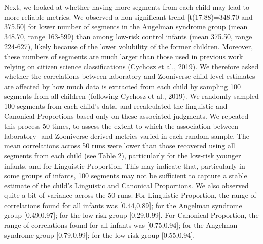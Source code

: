 \documentclass[english,,man]{apa6}
\begin{document}
Next, we looked at whether having more segments from each child may lead to more reliable metrics. We observed a non-significant trend {[}t(17.88)=348.70 and 375.50{]} for lower number of segments in the Angelman syndrome group (mean 348.70, range 163-599) than among low-risk control infants (mean 375.50, range 224-627), likely because of the lower volubility of the former children. Moreover, these numbers of segments are much larger than those used in previous work relying on citizen science classifications (Cychosz et al., 2019). We therefore asked whether the correlations between laboratory and Zooniverse child-level estimates are affected by how much data is extracted from each child by sampling 100 segments from all children (following Cychosz et al., 2019). We randomly sampled 100 segments from each child's data, and recalculated the linguistic and Canonical Proportions based only on these associated judgments. We repeated this process 50 times, to assess the extent to which the association between laboratory- and Zooniverse-derived metrics varied in each random sample. The mean correlations across 50 runs were lower than those recovered using all segments from each child (see Table 2), particularly for the low-risk younger infants, and for Linguistic Proportion. This may indicate that, particularly in some groups of infants, 100 segments may not be sufficient to capture a stable estimate of the child's Linguistic and Canonical Proportions. We also observed quite a bit of variance across the 50 runs. For Linguistic Proportion, the range of correlations found for all infants was {[}0.44,0.89{]}; for the Angelman syndrome group {[}0.49,0.97{]}; for the low-risk group {[}0.29,0.99{]}. For Canonical Proportion, the range of correlations found for all infants was {[}0.75,0.94{]}; for the Angelman syndrome group {[}0.79,0.99{]}; for the low-risk group {[}0.55,0.94{]}.
\end{document}
